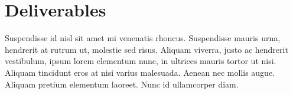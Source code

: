 \section{Deliverables}

Suspendisse id nisl sit amet mi venenatis rhoncus. Suspendisse mauris urna, hendrerit at rutrum ut, molestie sed risus. Aliquam viverra, justo ac hendrerit vestibulum, ipsum lorem elementum nunc, in ultrices mauris tortor ut nisi. Aliquam tincidunt eros at nisi varius malesuada. Aenean nec mollis augue. Aliquam pretium elementum laoreet. Nunc id ullamcorper diam.
